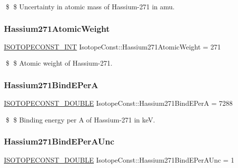 \$ \$ Uncertainty in atomic mass of Hassium-\/271 in amu. \mbox{\label{group___isotope_const-_hassium-_hs271_ga94e2ec2953de2cfbff474b047af68b41}} 
\subsubsection{\texorpdfstring{Hassium271\+Atomic\+Weight}{Hassium271AtomicWeight}}
{\footnotesize\ttfamily \mbox{\hyperlink{group___isotope_const-_macros_ga5f18360b3e99483a35c32d789e62621c}{I\+S\+O\+T\+O\+P\+E\+C\+O\+N\+S\+T\+\_\+\+I\+NT}} Isotope\+Const\+::\+Hassium271\+Atomic\+Weight = 271}

\$ \$ Atomic weight of Hassium-\/271. \mbox{\label{group___isotope_const-_hassium-_hs271_ga08e5b04a4be919d83c47026d771d1768}} 
\subsubsection{\texorpdfstring{Hassium271\+Bind\+E\+PerA}{Hassium271BindEPerA}}
{\footnotesize\ttfamily \mbox{\hyperlink{group___isotope_const-_macros_ga8f45a7272ce02c0b4c65c44636ed719a}{I\+S\+O\+T\+O\+P\+E\+C\+O\+N\+S\+T\+\_\+\+D\+O\+U\+B\+LE}} Isotope\+Const\+::\+Hassium271\+Bind\+E\+PerA = 7288}

\$ \$ Binding energy per A of Hassium-\/271 in keV. \mbox{\label{group___isotope_const-_hassium-_hs271_gac44901c520aa1aa8d4a28c5f605b34fa}} 
\subsubsection{\texorpdfstring{Hassium271\+Bind\+E\+Per\+A\+Unc}{Hassium271BindEPerAUnc}}
{\footnotesize\ttfamily \mbox{\hyperlink{group___isotope_const-_macros_ga8f45a7272ce02c0b4c65c44636ed719a}{I\+S\+O\+T\+O\+P\+E\+C\+O\+N\+S\+T\+\_\+\+D\+O\+U\+B\+LE}} Isotope\+Const\+::\+Hassium271\+Bind\+E\+Per\+A\+Unc = 1}

